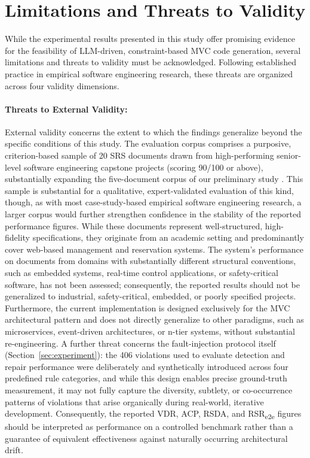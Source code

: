 \section{Limitations and Threats to Validity}
\label{sec:limitations}

While the experimental results presented in this study offer promising evidence for the feasibility of LLM-driven, constraint-based MVC code generation, several limitations and threats to validity must be acknowledged. Following established practice in empirical software engineering research, these threats are organized across four validity dimensions.

\paragraph{Threats to External Validity:}
External validity concerns the extent to which the findings generalize beyond the specific conditions of this study. The evaluation corpus comprises a purposive, criterion-based sample of 20 SRS documents drawn from high-performing senior-level software engineering capstone projects (scoring 90/100 or above), substantially expanding the five-document corpus of our preliminary study \citep{dim2026mvc}. This sample is substantial for a qualitative, expert-validated evaluation of this kind, though, as with most case-study-based empirical software engineering research, a larger corpus would further strengthen confidence in the stability of the reported performance figures. While these documents represent well-structured, high-fidelity specifications, they originate from an academic setting and predominantly cover web-based management and reservation systems. The system's performance on documents from domains with substantially different structural conventions, such as embedded systems, real-time control applications, or safety-critical software, has not been assessed; consequently, the reported results should not be generalized to industrial, safety-critical, embedded, or poorly specified projects. Furthermore, the current implementation is designed exclusively for the MVC architectural pattern and does not directly generalize to other paradigms, such as microservices, event-driven architectures, or n-tier systems, without substantial re-engineering. A further threat concerns the fault-injection protocol itself (Section~\ref{sec:experiment}): the 406 violations used to evaluate detection and repair performance were deliberately and synthetically introduced across four predefined rule categories, and while this design enables precise ground-truth measurement, it may not fully capture the diversity, subtlety, or co-occurrence patterns of violations that arise organically during real-world, iterative development. Consequently, the reported VDR, ACP, RSDA, and RSR\textsubscript{e2e} figures should be interpreted as performance on a controlled benchmark rather than a guarantee of equivalent effectiveness against naturally occurring architectural drift.

